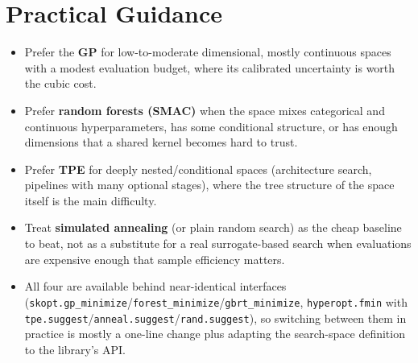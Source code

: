\documentclass[conference]{IEEEtran}
\begin{document}
\section*{Practical Guidance}
\begin{itemize}
    \item Prefer the \textbf{GP} for low-to-moderate dimensional, mostly continuous spaces with a modest evaluation budget, where its calibrated uncertainty is worth the cubic cost.
    \item Prefer \textbf{random forests (SMAC)} when the space mixes categorical and continuous hyperparameters, has some conditional structure, or has enough dimensions that a shared kernel becomes hard to trust.
    \item Prefer \textbf{TPE} for deeply nested/conditional spaces (architecture search, pipelines with many optional stages), where the tree structure of the space itself is the main difficulty.
    \item Treat \textbf{simulated annealing} (or plain random search) as the cheap baseline to beat, not as a substitute for a real surrogate-based search when evaluations are expensive enough that sample efficiency matters.
    \item All four are available behind near-identical interfaces (\texttt{skopt.gp\_minimize}/\texttt{forest\_minimize}/\texttt{gbrt\_minimize}, \texttt{hyperopt.fmin} with \texttt{tpe.suggest}/\texttt{anneal.suggest}/\texttt{rand.suggest}), so switching between them in practice is mostly a one-line change plus adapting the search-space definition to the library's API.
\end{itemize}
\end{document}
